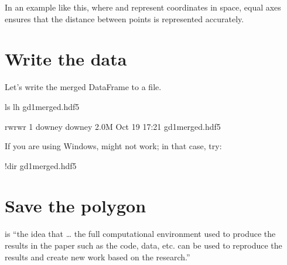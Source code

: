 \documentclass[letterpaper,10pt,english]{sphinxmanual}
\begin{document}
In an example like this, where  and  represent coordinates in space, equal axes ensures that the distance between points is represented accurately.


\section{Write the data}
\label{\detokenize{06_photo:write-the-data}}
Let’s write the merged DataFrame to a file.

\begin{sphinxVerbatim}[commandchars=\\\{\}]
  

 
 
\end{sphinxVerbatim}

\begin{sphinxVerbatim}[commandchars=\\\{\}]
ls \PYGZhy{}lh gd1\PYGZus{}merged.hdf5
\end{sphinxVerbatim}

\begin{sphinxVerbatim}[commandchars=\\\{\}]
\PYGZhy{}rw\PYGZhy{}rw\PYGZhy{}r\PYGZhy{}\PYGZhy{} 1 downey downey 2.0M Oct 19 17:21 gd1\PYGZus{}merged.hdf5
\end{sphinxVerbatim}

If you are using Windows,  might not work; in that case, try:

\begin{sphinxVerbatim}[commandchars=\\\{\}]
!dir gd1\PYGZus{}merged.hdf5
\end{sphinxVerbatim}


\section{Save the polygon}
\label{\detokenize{06_photo:save-the-polygon}}
 is “the idea that … the full computational environment used to produce the results in the paper such as the code, data, etc. can be used to reproduce the results and create new work based on the research.”
\end{document}
